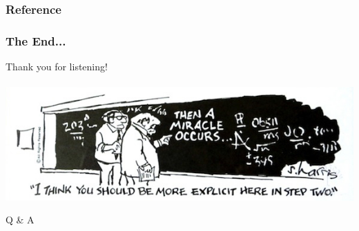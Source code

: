 \documentclass[xcolor=dvipsnames,hyperref={CJKbookmarks=true},aspectratio=169]{beamer}
\begin{document}
\begin{frame}%
    \frametitle{Reference}
	\small
    
\end{frame}

\begin{frame}\frametitle{The End...}
\centering
\Large
Thank you for listening! 
~\\
~\\

\includegraphics[width=0.9\linewidth]{miracle-occurs2.jpg}

Q \& A
\end{frame}

\appendix

\end{document}

